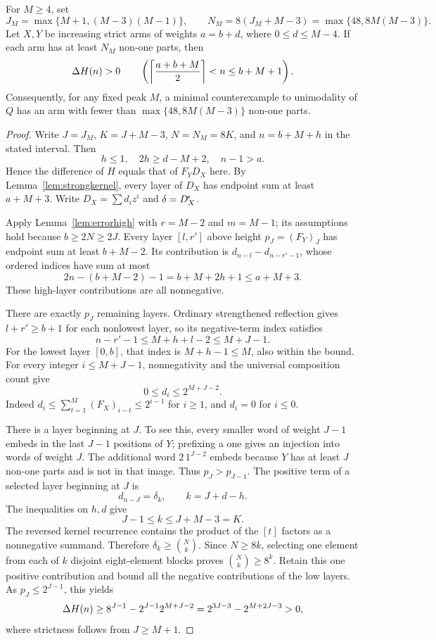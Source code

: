 \begin{theorem}\label{thm:uniformcentral}
For $M\ge4$, set
\[
 J_M=\max\{M+1,(M-3)(M-1)\},\qquad
 N_M=8(J_M+M-3)=\max\{48,8M(M-3)\}.
\]
Let $X,Y$ be increasing strict arms of weights $a=b+d$, where $0\le d\le M-4$. If each arm has at least $N_M$ non-one parts, then
\[
 \Delta H(n)>0\qquad
 \left(\left\lceil\frac{a+b+M}{2}\right\rceil<n\le b+M+1\right).
\]
Consequently, for any fixed peak $M$, a minimal counterexample to unimodality of $Q$ has an arm with fewer than $\max\{48,8M(M-3)\}$ non-one parts.
\end{theorem}
\begin{proof}
Write $J=J_M$, $K=J+M-3$, $N=N_M=8K$, and $n=b+M+h$ in the stated interval. Then
\[
 h\le1,\quad 2h\ge d-M+2,\quad n-1>a.
\]
Hence the difference of $H$ equals that of $F_YD_X$ here. By Lemma~\ref{lem:strongkernel}, every layer of $D_X$ has endpoint sum at least $a+M+3$. Write $D_X=\sum d_i z^i$ and $\delta=D_X^{\!*}$.

Apply Lemma~\ref{lem:errorhigh} with $r=M-2$ and $m=M-1$; its assumptions hold because $b\ge2N\ge2J$. Every layer $[l,r']$ above height $p_J=(F_Y)_J$ has endpoint sum at least $b+M-2$. Its contribution is $d_{n-l}-d_{n-r'-1}$, whose ordered indices have sum at most
\[
 2n-(b+M-2)-1=b+M+2h+1\le a+M+3.
\]
These high-layer contributions are all nonnegative.

There are exactly $p_J$ remaining layers. Ordinary strengthened reflection gives $l+r'\ge b+1$ for each nonlowest layer, so its negative-term index satisfies
\[
 n-r'-1\le M+h+l-2\le M+J-1.
\]
For the lowest layer $[0,b]$, that index is $M+h-1\le M$, also within the bound. For every integer $i\le M+J-1$, nonnegativity and the universal composition count give
\[
 0\le d_i\le 2^{M+J-2}.
\]
Indeed $d_i\le\sum_{t=1}^M (F_X)_{i-t}\le2^{i-1}$ for $i\ge1$, and $d_i=0$ for $i\le0$.

There is a layer beginning at $J$. To see this, every smaller word of weight $J-1$ embeds in the last $J-1$ positions of $Y$; prefixing a one gives an injection into words of weight $J$. The additional word $2\,1^{J-2}$ embeds because $Y$ has at least $J$ non-one parts and is not in that image. Thus $p_J>p_{J-1}$. The positive term of a selected layer beginning at $J$ is
\[
 d_{n-J}=\delta_k,\qquad k=J+d-h.
\]
The inequalities on $h,d$ give
\[
 J-1\le k\le J+M-3=K.
\]
The reversed kernel recurrence contains the product of the $[t]$ factors as a nonnegative summand. Therefore $\delta_k\ge\binom Nk$. Since $N\ge8k$, selecting one element from each of $k$ disjoint eight-element blocks proves $\binom Nk\ge8^k$. Retain this one positive contribution and bound all the negative contributions of the low layers. As $p_J\le2^{J-1}$, this yields
\[
 \Delta H(n)\ge8^{J-1}-2^{J-1}2^{M+J-2}
       =2^{3J-3}-2^{M+2J-3}>0,
\]
where strictness follows from $J\ge M+1$.


\end{proof}
